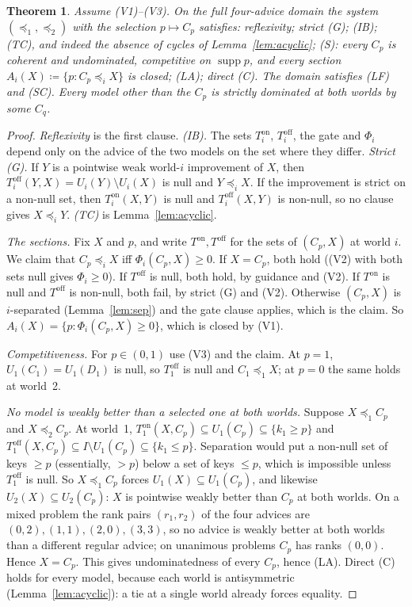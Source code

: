 \documentclass[11pt]{article}
\newtheorem{theorem}{Theorem}
\theoremstyle{definition}\newtheorem{definition}[theorem]{Definition}
\theoremstyle{remark}\newtheorem{remark}[theorem]{Remark}
\newcommand{\supp}{\operatorname{supp}}
\newcommand{\on}{\mathrm{on}}
\newcommand{\off}{\mathrm{off}}
\begin{document}
\begin{theorem}\label{thm:main}
Assume (V1)--(V3). On the full four-advice domain the system
$(\preceq_1,\preceq_2)$ with the selection $p\mapsto C_p$ satisfies:
reflexivity; strict (G); (IB); (TC), and indeed the absence of cycles of
Lemma~\ref{lem:acyclic}; (S): every $C_p$ is coherent and undominated,
competitive on $\supp p$, and every section $A_i(X)\coloneqq\{p:C_p\preceq_iX\}$
is closed; (LA); direct (C). The domain satisfies (LF) and (SC). Every model
other than the $C_p$ is strictly dominated at both worlds by some $C_q$.
\end{theorem}
\begin{proof}
\emph{Reflexivity} is the first clause. \emph{(IB).} The sets $T^\on_i$,
$T^\off_i$, the gate and $\Phi_i$ depend only on the advice of the two models
on the set where they differ. \emph{Strict (G).} If $Y$ is a pointwise weak
world-$i$ improvement of $X$, then $T^\off_i(Y,X)=U_i(Y)\setminus U_i(X)$ is
null and $Y\preceq_iX$. If the improvement is strict on a non-null set, then
$T^\on_i(X,Y)$ is null and $T^\off_i(X,Y)$ is non-null, so no clause gives
$X\preceq_iY$. \emph{(TC)} is Lemma~\ref{lem:acyclic}.

\emph{The sections.} Fix $X$ and $p$, and write $T^\on,T^\off$ for the sets of
$(C_p,X)$ at world $i$. We claim that $C_p\preceq_iX$ iff $\Phi_i(C_p,X)\ge0$.
If $X=C_p$, both hold ((V2) with both sets null gives $\Phi_i\ge0$). If
$T^\off$ is null, both hold, by guidance and (V2). If $T^\on$ is null and
$T^\off$ is non-null, both fail, by strict (G) and (V2). Otherwise
$(C_p,X)$ is $i$-separated (Lemma~\ref{lem:sep}) and the gate clause applies,
which is the claim. So $A_i(X)=\{p:\Phi_i(C_p,X)\ge0\}$, which is closed
by (V1).

\emph{Competitiveness.} For $p\in(0,1)$ use (V3) and the claim. At $p=1$,
$U_1(C_1)=U_1(D_1)$ is null, so $T^\off_1$ is null and $C_1\preceq_1X$; at
$p=0$ the same holds at world~2.

\emph{No model is weakly better than a selected one at both worlds.} Suppose
$X\preceq_1C_p$ and $X\preceq_2C_p$. At world~1, $T^\on_1(X,C_p)\subseteq
U_1(C_p)\subseteq\{k_1\ge p\}$ and $T^\off_1(X,C_p)\subseteq I\setminus
U_1(C_p)\subseteq\{k_1\le p\}$. Separation would put a non-null set of keys
$\ge p$ (essentially, $>p$) below a set of keys $\le p$, which is impossible
unless $T^\off_1$ is null. So $X\preceq_1C_p$ forces $U_1(X)\subseteq U_1(C_p)$,
and likewise $U_2(X)\subseteq U_2(C_p)$: $X$ is pointwise weakly better than
$C_p$ at both worlds. On a mixed problem the rank pairs $(r_1,r_2)$ of the four
advices are $(0,2),(1,1),(2,0),(3,3)$, so no advice is weakly better at both
worlds than a different regular advice; on unanimous problems $C_p$ has ranks
$(0,0)$. Hence $X=C_p$. This gives undominatedness of every $C_p$, hence (LA).
Direct (C) holds for every model, because each world is antisymmetric
(Lemma~\ref{lem:acyclic}): a tie at a single world already forces equality.


\end{proof}
\end{document}
